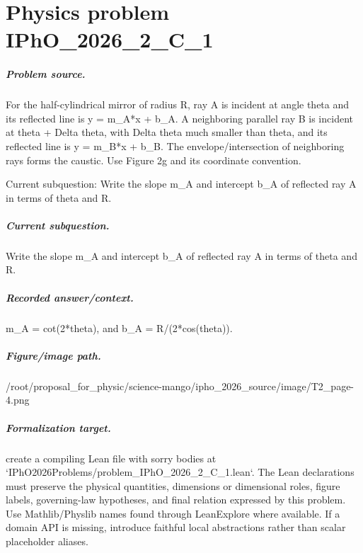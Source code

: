 
\chapter{Physics problem IPhO\_2026\_2\_C\_1}
\label{ch:IPhO2026Problems_problem_IPhO_2026_2_C_1}

\paragraph{Problem source.}
For the half-cylindrical mirror of radius R, ray A is incident at angle theta
and its reflected line is y = m\_A*x + b\_A.  A neighboring parallel ray B is
incident at theta + Delta theta, with Delta theta much smaller than theta, and
its reflected line is y = m\_B*x + b\_B.  The envelope/intersection of neighboring
rays forms the caustic.  Use Figure 2g and its coordinate convention.

Current subquestion:
Write the slope m\_A and intercept b\_A of reflected ray A in terms of theta and R.

\paragraph{Current subquestion.}
Write the slope m\_A and intercept b\_A of reflected ray A in terms of theta and R.

\paragraph{Recorded answer/context.}
m\_A = cot(2*theta), and b\_A = R/(2*cos(theta)).

\paragraph{Figure/image path.}
/root/proposal\_for\_physic/science-mango/ipho\_2026\_source/image/T2\_page-4.png

\paragraph{Formalization target.}
create a compiling Lean file with sorry bodies at `IPhO2026Problems/problem\_IPhO\_2026\_2\_C\_1.lean`.
The Lean declarations must preserve the physical quantities, dimensions or dimensional roles, figure labels, governing-law hypotheses, and final relation expressed by this problem.
Use Mathlib/Physlib names found through LeanExplore where available. If a domain API is missing, introduce faithful local abstractions rather than scalar placeholder aliases.

